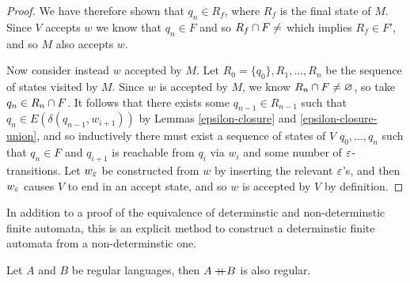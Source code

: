 \begin{proof}
    We have therefore shown that $q_n \in R_f$, where $R_f$ is the final state of $M$. Since $V$ accepts $w$ we know that $q_n \in F$ and so $R_f \intersection F \neq \empty$ which implies $R_f \in F'$, and so $M$ also accepts $w$.

    Now consider instead $w$ accepted by $M$. Let $R_0 = \{q_0\}, R_1, \ldots, R_n$ be the sequence of states visited by $M$. Since $w$ is accepted by $M$, we know $R_n \cap F \neq \varnothing$, so take $q_n \in R_n \cap F$. It follows that there exists some $q_{n-1} \in R_{n-1}$ such that $q_n \in E(\delta(q_{n-1}, w_{i+1}))$ by Lemmas \ref{epsilon-closure} and \ref{epsilon-closure-union}, and so inductively there must exist a sequence of states of $V$ $q_0, \ldots, q_n$ such that $q_n \in F$ and $q_{i+1}$ is reachable from $q_i$ via $w_i$ and some number of $\varepsilon$-transitions. Let $w_{\varepsilon}$ be constructed from $w$ by inserting the relevant $\varepsilon$'s, and then $w_{\varepsilon}$ causes $V$ to end in an accept state, and so $w$ is accepted by $V$ by definition.
\end{proof}

\begin{rmk}
    In addition to a proof of the equivalence of determinstic and non-determinstic finite automata, this is an explicit method to construct a determinstic finite automata from a non-determinstic one.
\end{rmk}

\begin{thm}\label{regular-language-concatenation}
    Let $A$ and $B$ be regular languages, then $A +\mkern-12mu+ B$ is also regular.
\end{thm}

